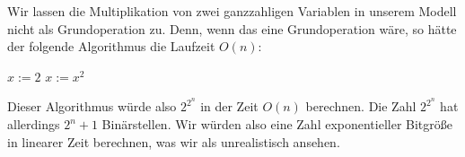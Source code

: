 \begin{bem} 
Wir lassen die Multiplikation von zwei ganzzahligen Variablen in unserem Modell nicht als Grundoperation zu. Denn, wenn das eine Grundoperation wäre, so hätte der folgende Algorithmus die Laufzeit $O(n)$: 

\begin{center}
	\begin{algorithmic}
		\STATE $x:=2$
		\STATE $x:=x^2$
		\ENDFOR
	\end{algorithmic}
\end{center}

Dieser Algorithmus würde also $2^{2^n}$ in der Zeit $O(n)$ berechnen. Die Zahl $2^{2^n}$ hat allerdings $2^n+1$ Binärstellen. Wir würden also eine Zahl exponentieller Bitgröße in linearer Zeit berechnen, was wir als unrealistisch ansehen. 
\end{bem}